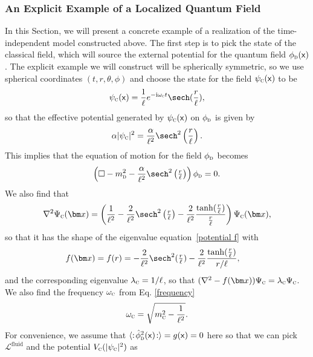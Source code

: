 \documentclass[letterpaper,12pt,titlepage,oneside,final]{book}
\newcommand{\mf}{\mathsf}%
\newcommand{\ii}{\mathrm{i}}
\newcommand{\tc}[1]{\textsc{#1}}
\begin{document}
\subsubsection*{An Explicit Example of a Localized Quantum Field}
\label{sec:example}

In this Section, we will present a concrete example of a realization of the time-independent model constructed above. The first step is to pick the state of the classical field, which will source the external potential for the quantum field $\phi_\tc{d}(\mf x)$. The explicit example we will construct will be spherically symmetric, so we use spherical coordinates $(t,r,\theta,\phi)$ and choose the state for the field $\psi_\tc{c}(\mf x)$ to be
\begin{equation}
    \psi_\tc{c}(\mf x) = \frac{1}{\ell}e^{-\ii \omega_\tc{c} t}\sech(\frac{r}{\ell}),
    \label{psic}
\end{equation}
so that the effective potential generated by $\psi_\tc{c}(\mf x)$ on $\phi_\tc{d}$ is given by
\begin{equation}
    \alpha|\psi_\tc{c}|^2 = \frac{\alpha}{\ell^2} \sech^2\left(\frac{r}{\ell}\right).
\end{equation}
This implies that the equation of motion for the field $\phi_\tc{d}$ becomes
\begin{equation}
    \left(\Box-m_\tc{d}^2 - \frac{\alpha}{\ell^2}\sech^2\left(\tfrac{r}{\ell}\right)\right)\phi_\tc{d}  = 0.
\end{equation}
We also find that
\begin{equation}
    \nabla^2 \Psi_\tc{c}(\bm x)  = \left(\frac{1}{\ell^2} -\frac{2}{\ell^2} \sech^2\left(\tfrac{r}{\ell}\right) - \frac{2}{\ell^2} \frac{\tanh(\tfrac{r}{\ell})}{\tfrac{r}{\ell}}\right)\Psi_\tc{c}(\bm x),
    \label{eqpsic}
\end{equation}
so that it has the shape of the eigenvalue equation~\eqref{potential f} with
\begin{align}
    f(\bm x) &= f(r) = -\frac{2}{\ell^2} \sech^2(\tfrac{r}{\ell}) - \frac{2}{\ell^2} \frac{\tanh(\tfrac{r}{\ell})}{r/\ell},
\end{align}
and the corresponding eigenvalue $\lambda_{\tc{c}} = 1/\ell$, so that \mbox{$(\nabla^2 - f(\bm x)) \Psi_\tc{c}= \lambda_{\tc{c}}\Psi_\tc{c}$}. We also find the frequency $\omega_\tc{c}$ from Eq. \eqref{frequency}
\begin{equation}
    \omega_{\tc{c}} = \sqrt{m_\tc{c}^2 - \frac{1}{\ell^2}}.
\end{equation}
For convenience, we assume that $\langle:\!\hat{\phi}_\tc{d}^2(\mf x)\!:\rangle = g(\mf x) = 0$ here so that we can pick $\mathcal{L}^\textrm{fluid}$ and the potential $V_\tc{c}(|\psi_\tc{c}|^2)$ as
\end{document}
